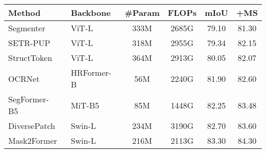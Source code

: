 \documentclass[10pt,twocolumn,letterpaper]{article}
\begin{document}
\begin{table}[t!]
\centering
\footnotesize
\renewcommand\arraystretch{1.05}
\setlength{\tabcolsep}{1.25mm}
    \begin{tabular}{l|l|c|c|c|c}
Method & Backbone & \#Param  & FLOPs & mIoU & +MS \\
        \hline
        Segmenter~\cite{strudel2021segmenter} & ViT-L & 333M & 2685G & 79.10 & 81.30\\
        SETR-PUP~\cite{zheng2021rethinking} & ViT-L  & 318M & 2955G &  79.34 & 82.15\\
        StructToken~\cite{lin2022structtoken} & ViT-L  & 364M  & 2913G & 80.05 & 82.07 \\
        OCRNet~\cite{yuan2020object,yuan2021hrformer} & HRFormer-B & 56M & 2240G & 81.90 & 82.60 \\
        SegFormer-B5~\cite{xie2021segformer} & MiT-B5 & 85M  & 1448G & 82.25 & 83.48  \\
        DiversePatch~\cite{gong2021vision} & Swin-L & 234M & 3190G  & 82.70 & 83.60 \\ 
        Mask2Former~\cite{cheng2022masked} & Swin-L & 216M   & 2113G & 83.30 & 84.30 \\
        

\end{tabular}
\end{table}
\end{document}
